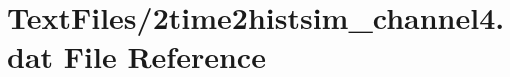 \hypertarget{2time2histsim__channel4_8dat}{}\section{Text\+Files/2time2histsim\+\_\+channel4.dat File Reference}
\label{2time2histsim__channel4_8dat}
